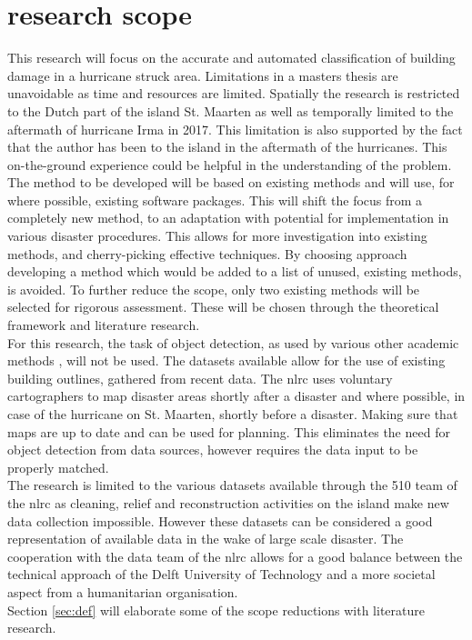 \section{research scope}
This research will focus on the accurate and automated classification of building damage in a hurricane struck area. Limitations in a masters thesis are unavoidable as time and resources are limited. Spatially the research is restricted to the Dutch part of the island St. Maarten as well as temporally limited to the aftermath of hurricane Irma in 2017. This limitation is also supported by the fact that the author has been to the island in the aftermath of the hurricanes. This on-the-ground experience could be helpful in the understanding of the problem. \\
The method to be developed will be based on existing methods and will use, for where possible, existing software packages. This will shift the focus from a completely new method, to an adaptation with potential for implementation in various disaster procedures. This allows for more investigation into existing methods, and cherry-picking effective techniques. By choosing approach developing a method which would be added to a list of unused, existing methods, is avoided. To further reduce the scope, only two existing methods will be selected for rigorous assessment. These will be chosen through the theoretical framework and literature research. \\
For this research, the task of object detection, as used by various other academic methods \citep{Vetrivel2016b,Kakooei2017}, will not be used. The datasets available allow for the use of existing building outlines, gathered from recent data. The \ac{nlrc} uses voluntary cartographers to map disaster areas shortly after a disaster and where possible, in case of the hurricane on St. Maarten, shortly before a disaster. Making sure that maps are up to date and can be used for planning. This eliminates the need for object detection from data sources, however requires the data input to be properly matched.\\
The research is limited to the various datasets available through the 510 team of the \ac{nlrc} as cleaning, relief and reconstruction activities on the island make new data collection impossible. However these datasets can be considered a good representation of available data in the wake of large scale disaster. The cooperation with the data team of the \ac{nlrc} allows for a good balance between the technical approach of the Delft University of Technology and a more societal aspect from a humanitarian organisation.\\ 
Section \ref{sec:def} will elaborate some of the scope reductions with literature research.

